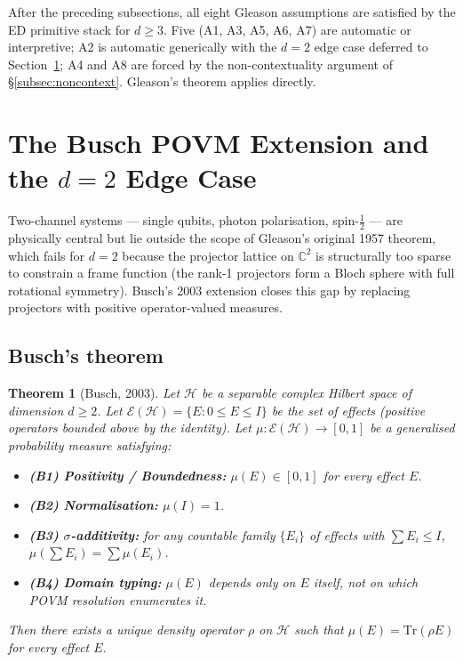 \documentclass[11pt,a4paper]{article}
\newtheorem{theorem}{Theorem}[section]
\begin{document}
After the preceding subsections, all eight Gleason assumptions are satisfied by the ED primitive stack for $d \geq 3$. Five (A1, A3, A5, A6, A7) are automatic or interpretive; A2 is automatic generically with the $d = 2$ edge case deferred to Section~\ref{sec:busch}; A4 and A8 are forced by the non-contextuality argument of \S\ref{subsec:noncontext}. Gleason's theorem applies directly.

\section{The Busch POVM Extension and the $d = 2$ Edge Case}\label{sec:busch}

Two-channel systems --- single qubits, photon polarisation, spin-$\tfrac{1}{2}$ --- are physically central but lie outside the scope of Gleason's original 1957 theorem, which fails for $d = 2$ because the projector lattice on $\mathbb{C}^2$ is structurally too sparse to constrain a frame function (the rank-1 projectors form a Bloch sphere with full rotational symmetry). Busch's 2003 extension closes this gap by replacing projectors with positive operator-valued measures.

\subsection{Busch's theorem}

\begin{theorem}[Busch, 2003]
Let $\mathcal{H}$ be a separable complex Hilbert space of dimension $d \geq 2$. Let $\mathcal{E}(\mathcal{H}) = \{E : 0 \leq E \leq I\}$ be the set of effects (positive operators bounded above by the identity). Let $\mu : \mathcal{E}(\mathcal{H}) \to [0, 1]$ be a generalised probability measure satisfying:
\begin{itemize}
  \item \textbf{(B1) Positivity / Boundedness:} $\mu(E) \in [0, 1]$ for every effect $E$.
  \item \textbf{(B2) Normalisation:} $\mu(I) = 1$.
  \item \textbf{(B3) $\sigma$-additivity:} for any countable family $\{E_i\}$ of effects with $\sum E_i \leq I$, $\mu(\sum E_i) = \sum \mu(E_i)$.
  \item \textbf{(B4) Domain typing:} $\mu(E)$ depends only on $E$ itself, not on which POVM resolution enumerates it.
\end{itemize}
Then there exists a unique density operator $\rho$ on $\mathcal{H}$ such that $\mu(E) = \mathrm{Tr}(\rho E)$ for every effect $E$.
\end{theorem}
\end{document}
